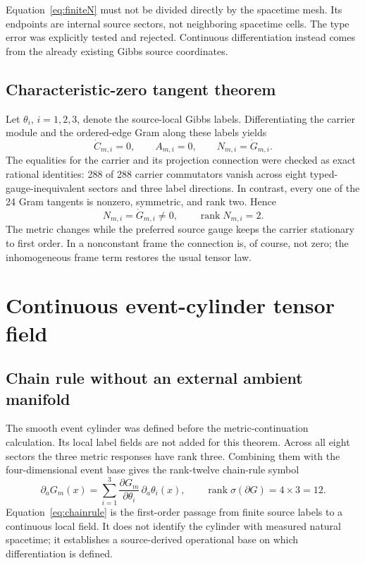 \documentclass[11pt]{article}
\theoremstyle{definition}
\theoremstyle{remark}
\newcommand{\rank}{\operatorname{rank}}
\begin{document}
Equation~\eqref{eq:finiteN} must not be divided directly by the spacetime mesh. Its endpoints are internal source sectors, not neighboring spacetime cells. The type error was explicitly tested and rejected. Continuous differentiation instead comes from the already existing Gibbs source coordinates.

\subsection{Characteristic-zero tangent theorem}

Let $\theta_i$, $i=1,2,3$, denote the source-local Gibbs labels. Differentiating the carrier module and the ordered-edge Gram along these labels yields
\begin{equation}
 \dot C_{m,i}=0,
 \qquad A_{m,i}=0,
 \qquad N_{m,i}=\dot G_{m,i}.
\end{equation}
The equalities for the carrier and its projection connection were checked as exact rational identities: 288 of 288 carrier commutators vanish across eight typed-gauge-inequivalent sectors and three label directions. In contrast, every one of the 24 Gram tangents is nonzero, symmetric, and rank two. Hence
\begin{equation}\label{eq:localN}
 N_{m,i}=\dot G_{m,i}\ne0,
 \qquad \rank N_{m,i}=2.
\end{equation}
The metric changes while the preferred source gauge keeps the carrier stationary to first order. In a nonconstant frame the connection is, of course, not zero; the inhomogeneous frame term restores the usual tensor law.

\section{Continuous event-cylinder tensor field}

\subsection{Chain rule without an external ambient manifold}

The smooth event cylinder was defined before the metric-continuation calculation. Its local label fields are not added for this theorem. Across all eight sectors the three metric responses have rank three. Combining them with the four-dimensional event base gives the rank-twelve chain-rule symbol
\begin{equation}\label{eq:chainrule}
 \partial_aG_m(x)=\sum_{i=1}^{3}
 \frac{\partial G_m}{\partial\theta_i}\,\partial_a\theta_i(x),
 \qquad \rank\sigma(\partial G)=4\times3=12.
\end{equation}
Equation~\eqref{eq:chainrule} is the first-order passage from finite source labels to a continuous local field. It does not identify the cylinder with measured natural spacetime; it establishes a source-derived operational base on which differentiation is defined.
\end{document}
